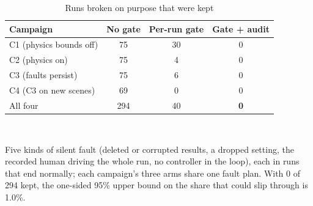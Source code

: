 \begin{table}[t]
\caption{Runs broken on purpose that were kept}
\label{tab:validity}
\centering\footnotesize
\begin{tabular}{@{}lccc@{}}
\toprule
Campaign & No gate & Per-run gate & Gate + audit \\
\midrule
C1 (physics bounds off) & 75 & 30 & 0 \\
C2 (physics on) & 75 & 4 & 0 \\
C3 (faults persist) & 75 & 6 & 0 \\
C4 (C3 on new scenes) & 69 & 0 & 0 \\
\midrule
All four & 294 & 40 & \textbf{0} \\
\bottomrule
\end{tabular}
\\[2pt]\parbox{\columnwidth}{\scriptsize Five kinds of silent fault (deleted or corrupted results, a dropped setting, the recorded human driving the whole run, no controller in the loop), each in runs that end normally; each campaign's three arms share one fault plan. With 0 of 294 kept, the one-sided 95\% upper bound on the share that could slip through is 1.0\%.}
\end{table}
